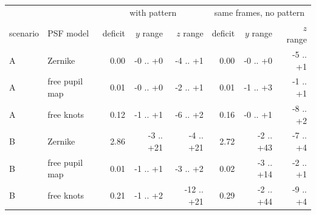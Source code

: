 \begin{tabular}{llrrrrrr}\toprule
 & & \multicolumn{3}{c}{with pattern} & \multicolumn{3}{c}{same frames, no pattern}\\
scenario & PSF model & deficit & $y$ range & $z$ range & deficit & $y$ range & $z$ range\\ \midrule
A & Zernike & 0.00 & -0 .. +0 & -4 .. +1 & 0.00 & -0 .. +0 & -5 .. +1\\
A & free pupil map & 0.01 & -0 .. +0 & -2 .. +1 & 0.01 & -1 .. +3 & -1 .. +1\\
A & free knots & 0.12 & -1 .. +1 & -6 .. +2 & 0.16 & -0 .. +1 & -8 .. +2\\
B & Zernike & 2.86 & -3 .. +21 & -4 .. +21 & 2.72 & -2 .. +43 & -7 .. +4\\
B & free pupil map & 0.01 & -1 .. +1 & -3 .. +2 & 0.02 & -3 .. +14 & -2 .. +1\\
B & free knots & 0.21 & -1 .. +2 & -12 .. +21 & 0.29 & -2 .. +44 & -9 .. +4\\
\bottomrule\end{tabular}